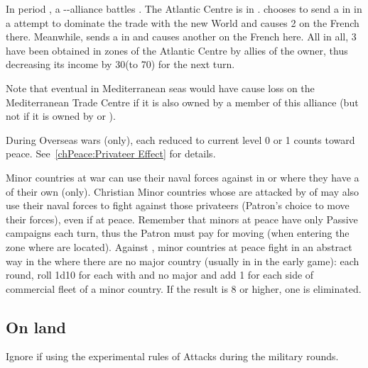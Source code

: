 \begin{exemple}
  In period , a \HOL-\ANG-\SPA alliance battles \FRA. The Atlantic
  Centre is in \HOL. \ANG chooses to send a \corsaire in  in
  a attempt to dominate the trade with the new World and causes 2 \textetoile
  on the French \TradeFLEET there. Meanwhile, \SPA sends a \corsaire in
   and causes another \textetoile on the French \TradeFLEET
  here. All in all, 3 \textetoile have been obtained in zones of the Atlantic
  Centre by allies of the owner, thus decreasing its income by 30\ducats (to
  70\ducats) for the next turn.

  Note that eventual \textetoile in Mediterranean seas would have cause loss
  on the Mediterranean Trade Centre if it is also owned by a member of this
  alliance (but not if it is owned by \FRA or \TUR).
\end{exemple}

\bparag During Overseas wars (only), each \TradeFLEET\Faceplus reduced to
current level 0 or 1 counts toward peace.
\bparag See~\ref{chPeace:Privateer Effect} for details.

\begin{todo}
\bparag Minor countries at war can use their naval forces against \corsaire in
\STZ or \CTZ where they have a \TradeFLEET of their own (only).
\bparag Christian Minor countries whose \TradeFLEET are attacked by \corsaire
of \Barbaresques may also use their naval forces to fight against those
privateers (Patron's choice to move their forces), even if at peace.
\bparag Remember that minors at peace have only Passive campaigns each turn,
thus the Patron must pay for moving (when entering the zone where \corsaire
are located).
\bparag Against , minor countries at peace fight in an abstract
way in the \STZ where there are no major country \TradeFLEET (usually in
 in the early game): each round, roll 1d10 for each \STZ with
 \corsaire and no major \TradeFLEET and add 1 for each side of
commercial fleet of a minor country.  If the result is 8 or higher, one
\corsaire\facemoins is eliminated.
\end{todo}

\subsection{On land}
\begin{designnote}
  Ignore if using the experimental rules of Attacks during the military
  rounds.
\end{designnote}

